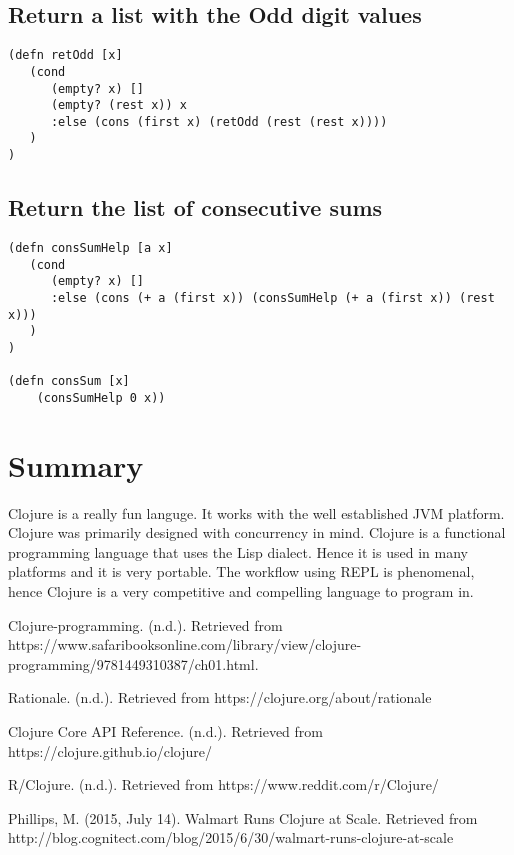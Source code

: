 \documentclass{article}
\begin{document}
\subsection{Return a list with the Odd digit values}
\begin{lstlisting}
(defn retOdd [x]
   (cond
      (empty? x) []
      (empty? (rest x)) x
      :else (cons (first x) (retOdd (rest (rest x))))
   )
)
\end{lstlisting}

\subsection{Return the list of consecutive sums}
\begin{lstlisting}
(defn consSumHelp [a x]
   (cond
      (empty? x) []
      :else (cons (+ a (first x)) (consSumHelp (+ a (first x)) (rest x)))
   )
)

(defn consSum [x]
    (consSumHelp 0 x))
\end{lstlisting}

\section{Summary}
Clojure is a really fun languge. It works with the well established JVM platform. Clojure was primarily designed with concurrency in mind. Clojure is a functional programming language that uses the Lisp dialect. Hence it is used in many platforms and it is very portable. The workflow using REPL is phenomenal, hence Clojure is a very competitive and compelling language to program in.



  


\begin{thebibliography}{1}

\newblock Clojure-programming. (n.d.). 
\newblock Retrieved from \\ https://www.safaribooksonline.com/library/view/clojure-programming/9781449310387/ch01.html.

\newblock Rationale. (n.d.). Retrieved from https://clojure.org/about/rationale


\newblock Clojure Core API Reference. (n.d.). Retrieved from  https://clojure.github.io/clojure/

\newblock R/Clojure. (n.d.). Retrieved from https://www.reddit.com/r/Clojure/

\newblock Phillips, M. (2015, July 14). Walmart Runs Clojure at Scale. Retrieved from \\ http://blog.cognitect.com/blog/2015/6/30/walmart-runs-clojure-at-scale

\end{thebibliography}
\end{document}
